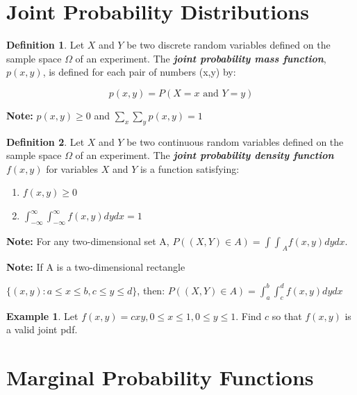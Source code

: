 \documentclass[
  11pt,
  oneside]{book}
\providecommand{\tightlist}{%
  \setlength{\itemsep}{0pt}\setlength{\parskip}{0pt}}
\theoremstyle{definition}
\newtheorem{definition}{Definition}[chapter]
\theoremstyle{definition}
\newtheorem{example}{Example}[chapter]
\theoremstyle{definition}
\theoremstyle{definition}
\theoremstyle{remark}
\begin{document}
\section{Joint Probability Distributions}\label{joint-probability-distributions}

\begin{definition}
Let \(X\) and \(Y\) be two discrete random variables defined on the sample space \(\Omega\) of an experiment. The \textbf{\emph{joint probability mass function}}, \(p(x,y)\), is defined for each pair of numbers (x,y) by:

\[p(x,y) = P(X=x \text{ and } Y=y)\]

\textbf{Note:} \(p(x,y) \geq 0\) and \(\sum_x \sum_y p(x,y) = 1\)
\end{definition}

\begin{definition}

Let \(X\) and \(Y\) be two continuous random variables defined on the sample space \(\Omega\) of an experiment. The \textbf{\emph{joint probability density function}} \(f(x,y)\) for variables \(X\) and \(Y\) is a function satisfying:

\begin{enumerate}
\def\labelenumi{\arabic{enumi}.}
\tightlist
\item
  \(f(x,y) \geq 0\)\\
\item
  \(\int_{-\infty}^{\infty} \int_{-\infty}^{\infty} f(x,y) dy dx = 1\)
\end{enumerate}

\end{definition}

\textbf{Note:} For any two-dimensional set A, \(P((X,Y) \in A) = {\int \int}_A f(x,y) dy dx\).

\textbf{Note:} If A is a two-dimensional rectangle

\(\{(x,y): a \le x \le b, c \le y \le d\}\), then: \(P((X,Y) \in A) = \int_a^b \int_c^d f(x,y) dy dx\)

\newpage

\begin{example}
Let \(f(x,y) = c xy, 0 \leq x \leq 1, 0 \leq y \leq 1\). Find \(c\) so that \(f(x,y)\) is a valid joint pdf.
\end{example}

\newpage

\section{Marginal Probability Functions}\label{marginal-probability-functions}
\end{document}
